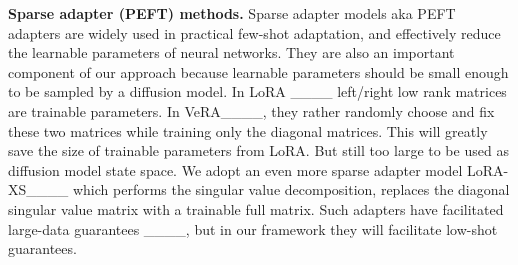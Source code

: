 \textbf{Sparse adapter (PEFT) methods.}
Sparse adapter models aka PEFT adapters are widely used in practical few-shot adaptation, and effectively reduce the learnable parameters of neural networks. They are also an important component of our approach because learnable parameters should be small enough to be sampled by a diffusion model. 
In LoRA  ____ left/right low rank matrices are trainable parameters. In VeRA____, they rather randomly choose and fix these two matrices while training only the diagonal matrices. This will greatly save the size of trainable parameters from LoRA. But still too large to be used as diffusion model state space. We adopt an even more sparse adapter model %
LoRA-XS____ which performs the singular value decomposition, replaces the diagonal singular value matrix with a trainable full matrix. Such adapters have facilitated large-data guarantees ____, but in our framework they will facilitate low-shot guarantees.



